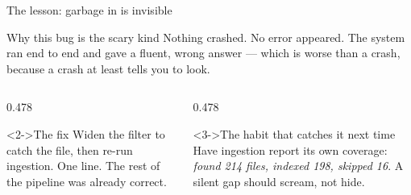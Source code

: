 \documentclass[aspectratio=169,11pt]{beamer}
\begin{document}
\begin{frame}{The lesson: garbage in is invisible}
  \begin{block}{Why this bug is the scary kind}
    Nothing crashed. No error appeared. The system ran end to end and gave a
    fluent, wrong answer --- which is worse than a crash, because a crash at
    least tells you to look.
  \end{block}
  \medskip
  \begin{columns}[T,onlytextwidth]
    \begin{column}{0.478\textwidth}
      \begin{exampleblock}<2->{The fix}
        Widen the filter to catch the file, then re-run ingestion. One
        line. The rest of the pipeline was already correct.
      \end{exampleblock}
    \end{column}
    \begin{column}{0.478\textwidth}
      \begin{block}<3->{The habit that catches it next time}
        Have ingestion report its own coverage: \emph{found 214 files,
        indexed 198, skipped 16}. A silent gap should scream, not hide.
      \end{block}
    \end{column}
  \end{columns}
  \medskip
\end{frame}
\end{document}
